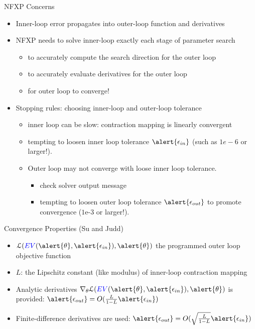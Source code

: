 \documentclass[aspectratio=169,11pt]{beamer}
\begin{document}
\begin{frame}{NFXP Concerns}
\begin{itemize}
\item Inner-loop error propagates into outer-loop function and derivatives
\item NFXP needs to solve inner-loop exactly each stage of parameter search
\begin{itemize}
\item to accurately compute the search direction for the outer loop
\item to accurately evaluate derivatives for the outer loop
\item for outer loop to converge!
\end{itemize}
\item Stopping rules: choosing inner-loop and outer-loop tolerance
\begin{itemize}
\item inner loop can be slow: contraction mapping is linearly convergent
\item tempting to loosen inner loop tolerance $\alert{\epsilon_{in}}$ (such as $1e-6$ or larger!).
\item Outer loop may not converge with loose inner loop tolerance.
\begin{itemize}
\item check solver output message
\item tempting to loosen outer loop tolerance $\alert{\epsilon_{out}}$ to promote convergence ($1\text{e-}3$ or larger!).
\end{itemize}
\end{itemize}
\end{itemize}
\end{frame}

\begin{frame}{Convergence Properties (Su and Judd)}
\begin{itemize}
\item $\mathcal{L}(\textcolor{blue}{EV}(\alert{\theta},\alert{\epsilon_{in}} ), \alert{\theta} )$ the programmed outer loop objective function
\item $L$: the Lipschitz constant (like modulus) of inner-loop contraction mapping
\item Analytic derivatives $\nabla_{\theta} \mathcal{L}(\textcolor{blue}{EV}(\alert{\theta},\alert{\epsilon_{in}} ), \alert{\theta} )$ is provided: $\alert{\epsilon_{out}} = O(\frac{L}{1-L} \alert{\epsilon_{in}})$
\item Finite-difference derivatives are used: $\alert{\epsilon_{out}} = O ( \sqrt{\frac{L}{1-L}} \alert{\epsilon_{in}} )$ 
\end{itemize}
\end{frame}
\end{document}
